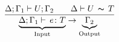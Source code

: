 \begin{figure}[h!]
  \begin{gather*}
    \frac{\Delta;\Gamma_1 \vdash U;\Gamma_2 \qquad \Delta \vdash U\,\thicksim\,T}
         {\underbrace{\Delta;\Gamma_1 \vdash \, e \colon T}_{\text{Input}} \rightarrow \underbrace{\Gamma_2}_{\text{Output}}}
  \end{gather*}
  \label{fig:check-against}
\end{figure}


